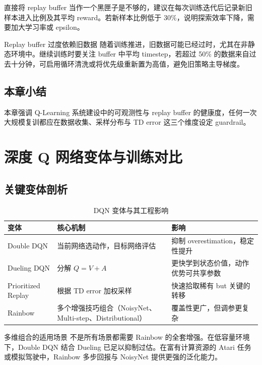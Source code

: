\documentclass[a4paper]{article}
\begin{document}
直接将 replay buffer 当作一个黑匣子是不够的，建议在每次训练迭代后记录新旧样本进入比例及其平均 reward。若新样本比例低于 30\%，说明探索效率下降，需要加大学习率或 epsilon。

\begin{warningbox}{Replay buffer 过度依赖旧数据}
随着训练推进，旧数据可能已经过时，尤其在非静态环境中。继续训练时要关注 buffer 中平均 timestep，若超过 50\% 的数据来自过去十分钟，可启用循环清洗或将优先级重新置为高值，避免旧策略主导梯度。
\end{warningbox}

\subsection{本章小结}

本章强调 Q-Learning 系统建设中的可观测性与 replay buffer 的健康度，任何一次大规模复训都应在数据收集、采样分布与 TD error 这三个维度设定 guardrail。

\section{深度 Q 网络变体与训练对比}

\subsection{关键变体剖析}

\begin{table}[H]
\centering
\begin{tabular}{lll}
\toprule
变体 & 核心机制 & 影响 \\
\midrule
Double DQN & 当前网络选动作，目标网络评估 & 抑制 overestimation，稳定性提升 \\
Dueling DQN & 分解 $Q=V+A$ & 更快学到状态价值，动作优势可共享参数 \\
Prioritized Replay & 根据 TD error 加权采样 & 快速拾取稀有 but 关键的转移 \\
Rainbow & 多个增强技巧组合（NoisyNet、Multi-step、Distributional） & 覆盖性更广，但调参更复杂 \\
\bottomrule
\end{tabular}
\caption{DQN 变体与其工程影响}
\end{table}

\begin{knowledgebox}{多维组合的适用场景}
不是所有场景都需要 Rainbow 的全套增强。在低容量环境下，Double DQN 结合 Dueling 已足以抑制过估。在富有计算资源的 Atari 任务或模拟驾驶中，Rainbow 多步回报与 NoisyNet 提供更强的泛化能力。
\end{knowledgebox}
\end{document}
